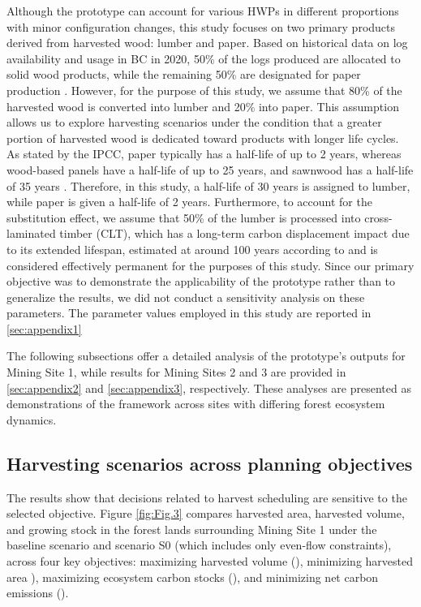 \documentclass[preprint,12pt]{elsarticle}
\begin{document}
Although the prototype can account for various HWPs in different proportions with minor configuration changes, this study focuses on two primary products derived from harvested wood: lumber and paper. Based on historical data on log availability and usage in BC in 2020, 50\% of the logs produced are allocated to solid wood products, while the remaining 50\% are designated for paper production \citep{BC_Mill_List_2020}. However, for the purpose of this study, we assume that 80\% of the harvested wood is converted into lumber and 20\% into paper. This assumption allows us to explore harvesting scenarios under the condition that a greater portion of harvested wood is dedicated toward products with longer life cycles. As stated by the IPCC, paper typically has a half-life of up to 2 years, whereas wood-based panels have a half-life of up to 25 years, and sawnwood has a half-life of 35 years \citep{Brunet-Navarro2016}. Therefore, in this study, a half-life of 30 years is assigned to lumber, while paper is given a half-life of 2 years. Furthermore, to account for the substitution effect, we assume that 50\% of the lumber is processed into cross-laminated timber (CLT), which has a long-term carbon displacement impact due to its extended lifespan, estimated at around 100 years according to \citet{head2020dynamic} and is considered effectively permanent for the purposes of this study. Since our primary objective was to demonstrate the applicability of the prototype rather than to generalize the results, we did not conduct a sensitivity analysis on these parameters. The parameter values employed in this study are reported in \ref{sec:appendix1}

The following subsections offer a detailed analysis of the prototype’s outputs for Mining Site 1, while results for Mining Sites 2 and 3 are provided in \ref{sec:appendix2} and \ref{sec:appendix3}, respectively. These analyses are presented as demonstrations of the framework across sites with differing forest ecosystem dynamics.

\subsection{Harvesting scenarios across planning objectives}
\label{sec: comparison scenarios/objectives}
The results show that decisions related to harvest scheduling are sensitive to the selected objective. Figure \ref{fig:Fig.3} compares harvested area, harvested volume, and growing stock in the forest lands surrounding Mining Site 1 under the baseline scenario and scenario S0 (which includes only even-flow constraints), across four key objectives: maximizing harvested volume (), minimizing harvested area ), maximizing ecosystem carbon stocks (), and minimizing net carbon emissions ().
\end{document}
